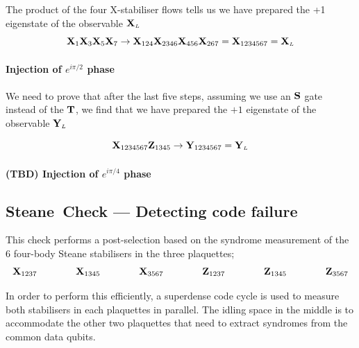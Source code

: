 \documentclass{article}
\newcommand{\sub}[1]{_{\scriptscriptstyle #1}}
\newcommand{\Op}[1]{{\bf #1}}
\begin{document}
	The product of the four X-stabiliser flows tells us we have prepared the +1 eigenstate of the observable $\Op{X}\sub{L}$
	\begin{equation*}
		\Op{X}_{1}\Op{X}_{3}\Op{X}_{5}\Op{X}_{7} \rightarrow \Op{X}_{124}\Op{X}_{2346}\Op{X}_{456}\Op{X}_{267} = \Op{X}_{1234567} = \Op{X}\sub{L}
	\end{equation*}

	\paragraph{Injection of $e^{i\pi/2}$ phase}

	We need to prove that after the last five steps, assuming we use an $\Op{S}$ gate instead of the $\Op{T}$, we find that we have prepared the $+1$ eigenstate of the observable $\Op{Y}\sub{L}$

	\begin{equation*}
		\Op{X}_{1234567}\Op{Z}_{1345} \rightarrow \Op{Y}_{1234567} = \Op{Y}\sub{L}
	\end{equation*}

	\paragraph{(TBD) Injection of $e^{i\pi/4}$ phase}

	\newpage

	\subsection{\mbox{\sc Steane Check} --- Detecting code failure}

	This check performs a post-selection based on the syndrome measurement of the $6$ four-body Steane stabilisers in the three plaquettes;
	\begin{equation*}
		\Op{X}_{1237} \qquad\qquad \Op{X}_{1345} \qquad\qquad \Op{X}_{3567}
		\qquad\qquad
		\Op{Z}_{1237} \qquad\qquad \Op{Z}_{1345} \qquad\qquad \Op{Z}_{3567}
	\end{equation*}

	In order to perform this efficiently, a superdense code cycle is used to measure both stabilisers in each plaquettes in parallel. The idling space in the middle is to accommodate the other two plaquettes that need to extract syndromes from the common data qubits.
\end{document}
